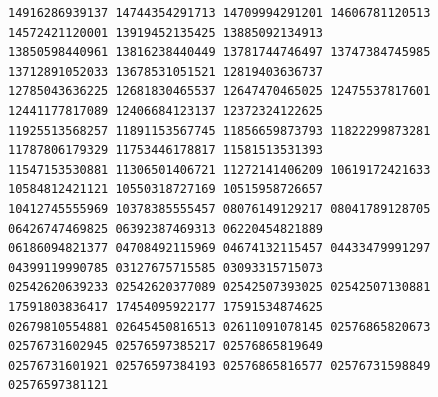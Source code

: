 \documentclass[10pt]{article}
\begin{document}
\begin{verbatim}
14916286939137 14744354291713 14709994291201 14606781120513 14572421120001 13919452135425 13885092134913
13850598440961 13816238440449 13781744746497 13747384745985 13712891052033 13678531051521 12819403636737
12785043636225 12681830465537 12647470465025 12475537817601 12441177817089 12406684123137 12372324122625
11925513568257 11891153567745 11856659873793 11822299873281 11787806179329 11753446178817 11581513531393
11547153530881 11306501406721 11272141406209 10619172421633 10584812421121 10550318727169 10515958726657
10412745555969 10378385555457 08076149129217 08041789128705 06426747469825 06392387469313 06220454821889
06186094821377 04708492115969 04674132115457 04433479991297 04399119990785 03127675715585 03093315715073
02542620639233 02542620377089 02542507393025 02542507130881 17591803836417 17454095922177 17591534874625
02679810554881 02645450816513 02611091078145 02576865820673 02576731602945 02576597385217 02576865819649
02576731601921 02576597384193 02576865816577 02576731598849 02576597381121
\end{verbatim}
\end{document}
